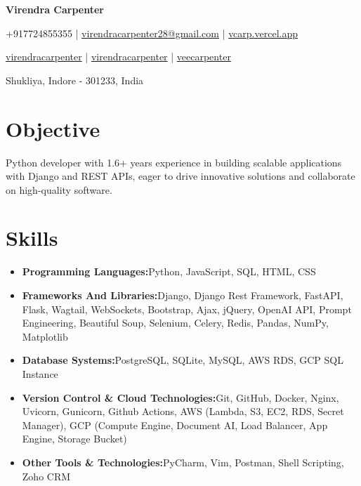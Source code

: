 \documentclass[a4paper,11pt]{article}
\newcommand{\resumeItem}[2]{
  \item{
    \textbf{#1}{\hspace{0.5mm}#2 \vspace{-0.5mm}}
  }
}
\newcommand{\resumeSubItem}[2]{\resumeItem{#1}{#2}\vspace{-4pt}}
\newcommand{\resumeHeadingSkillStart}{\begin{itemize}[leftmargin=*,itemsep=1.7mm, rightmargin=2ex]}
\newcommand{\resumeHeadingSkillEnd}{\end{itemize}\vspace{-2mm}}
\newcommand{\socialicon}[1]{\raisebox{-0.05em}{\resizebox{!}{1em}{#1}}}
\newcommand{\headerfontiii}{\fontfamily{ppl}\selectfont} %
\begin{document}
\headerfontiii

\begin{center}
    {\Huge\textbf{Virendra Carpenter}}
\end{center}
\vspace{-6mm}

\begin{center}
    \small{
    +917724855355 | \href{mailto:virendracarpenter28@gmail.com}{virendracarpenter28@gmail.com} | 
    \href{https://vcarp.vercel.app/}{vcarp.vercel.app}
    }
\end{center}
\vspace{-6mm}

\begin{center}
    \small{
    \socialicon{\faLinkedin} \href{https://www.linkedin.com/in/virendracarpenter/}{virendracarpenter} | 
    \socialicon{\faGithub} \href{https://github.com/virendracarpenter}{virendracarpenter} | 
    \socialicon{\faTwitter} \href{https://twitter.com/veecarpenter}{veecarpenter}
    }
\end{center}
\vspace{-6mm}
\begin{center}
    \small{Shukliya, Indore - 301233, India}
\end{center}

\vspace{-4mm}

\section{\textbf{Objective}}
\vspace{1mm}
\small{
  Python developer with 1.6+ years experience in building scalable applications with Django and REST APIs, eager to drive innovative solutions and collaborate on high-quality software.
}
\vspace{-2mm}


\section{\textbf{Skills}}
\vspace{-0.2mm}
  \resumeHeadingSkillStart
    \resumeSubItem{Programming Languages:}
      {Python, JavaScript, SQL, HTML, CSS}
    \resumeSubItem{Frameworks And Libraries:}
      {Django, Django Rest Framework, FastAPI, Flask, Wagtail, WebSockets, Bootstrap, Ajax,  jQuery, OpenAI API, Prompt Engineering, Beautiful Soup, Selenium, Celery, Redis, Pandas, NumPy, Matplotlib}
    \resumeSubItem{Database Systems:}
      {PostgreSQL, SQLite, MySQL, AWS RDS, GCP SQL Instance}
    \resumeSubItem{Version Control \& Cloud Technologies:}
      {Git, GitHub, Docker, Nginx, Uvicorn, Gunicorn, Github Actions, AWS (Lambda, S3, EC2, RDS, Secret Manager), GCP (Compute Engine, Document AI, Load Balancer, App Engine, Storage Bucket)}
    \resumeSubItem{Other Tools \& Technologies:}
      {PyCharm, Vim, Postman, Shell Scripting,  Zoho CRM}
  \resumeHeadingSkillEnd
\end{document}
